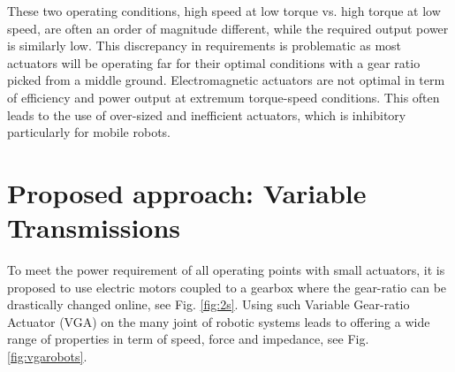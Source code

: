 These two operating conditions, high speed at low torque vs. high torque at low speed, are often an order of magnitude different, while the required output power is similarly low. This discrepancy in requirements is problematic as most actuators will be operating far for their optimal conditions with a gear ratio picked from a middle ground. Electromagnetic actuators are not optimal in term of efficiency and power output at extremum torque-speed conditions. This often leads to the use of over-sized and inefficient actuators, which is inhibitory particularly for mobile robots.


%




\section{Proposed approach: Variable Transmissions}
\label{sec:ProposedSolutionRobotsUsingMultipleGearRatioActuators}


To meet the power requirement of all operating points with small actuators, it is proposed to use electric motors coupled to a gearbox where the gear-ratio can be drastically changed online, see Fig. \ref{fig:2s}. Using such Variable Gear-ratio Actuator (VGA) on the many joint of robotic systems leads to offering a wide range of properties in term of speed, force and impedance, see Fig. \ref{fig:vgarobots}.

